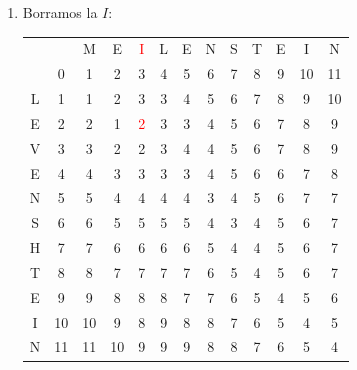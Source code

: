 \documentclass[10pt,a4paper,spanish]{report}
\theoremstyle{definition}
\theoremstyle{remark}
\begin{document}
\begin{enumerate}
\item Borramos la $I$:
\begin{center}
\begin{tabular}{c|c|c|c|c|c|c|c|c|c|c|c|c|}
\multicolumn{2}{r}{} & \multicolumn{1}{c}{M} & \multicolumn{1}{c}{E} & \multicolumn{1}{c}{\textcolor{Red}{I}} & \multicolumn{1}{c}{L} & \multicolumn{1}{c}{E} & \multicolumn{1}{c}{N} & \multicolumn{1}{c}{S} & \multicolumn{1}{c}{T} & \multicolumn{1}{c}{E} & \multicolumn{1}{c}{I} & \multicolumn{1}{c}{N} \\ 
\cline{2-13} 
& 0 & 1 & 2 & 3 & 4 & 5 & 6 & 7 & 8 & 9 & 10 & 11 \\
\cline{2-13}
L & 1 & 1 & 2 & 3 & 3 & 4 & 5 & 6 & 7 & 8 & 9 & 10 \\
\cline{2-13} 
E & 2 & 2 & \cellcolor{Cyan}1 & \textcolor{Red}{2} & 3 & 3 & 4 & 5 & 6 & 7 & 8 & 9 \\
\cline{2-13} 
V & 3 & 3 & 2 & 2 & \cellcolor{Green}3 & 4 & 4 & 5 & 6 & 7 & 8 & 9 \\
\cline{2-13} 
E & 4 & 4 & 3 & 3 & 3 & \cellcolor{Green}3 & 4 & 5 & 6 & 6 & 7 & 8 \\
\cline{2-13} 
N & 5 & 5 & 4 & 4 & 4 & 4 & \cellcolor{Green}3 & 4 & 5 & 6 & 7 & 7 \\
\cline{2-13} 
S & 6 & 6 & 5 & 5 & 5 & 5 & 4 & \cellcolor{Green}3 & 4 & 5 & 6 & 7 \\
\cline{2-13} 
H & 7 & 7 & 6 & 6 & 6 & 6 & 5 & \cellcolor{Green}4 & 4 & 5 & 6 & 7 \\
\cline{2-13} 
T & 8 & 8 & 7 & 7 & 7 & 7 & 6 & 5 & \cellcolor{Green}4 & 5 & 6 & 7 \\
\cline{2-13}
E & 9 & 9 & 8 & 8 & 8 & 7 & 7 & 6 & 5 & \cellcolor{Green}4 & 5 & 6 \\
\cline{2-13} 
I & 10 & 10 & 9 & 8 & 9 & 8 & 8 & 7 & 6 & 5 & \cellcolor{Green}4 & 5 \\
\cline{2-13} 
N & 11 & 11 & 10 & 9 & 9 & 9 & 8 & 8 & 7 & 6 & 5 & \cellcolor{Green}4 \\
\cline{2-13} 
\end{tabular}
\end{center}


\end{enumerate}
\end{document}
